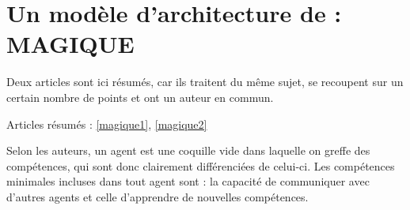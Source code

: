 \section{Un modèle d'architecture de  : MAGIQUE}
Deux articles sont ici résumés, car ils traitent du même sujet, se recoupent sur un certain nombre de points et ont un auteur en commun.

Articles résumés : \ref{magique1}, \ref{magique2}

Selon les auteurs, un agent est une \og{}coquille vide\fg{} dans laquelle on greffe des compétences, qui sont donc clairement différenciées de celui-ci. Les compétences minimales incluses dans tout agent sont : la capacité de communiquer avec d'autres agents et celle d'apprendre de nouvelles compétences.
